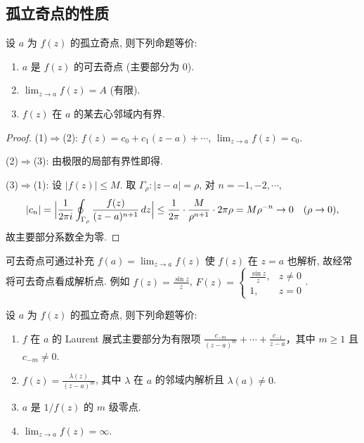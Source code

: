 \documentclass[theorem=false,mathfont=none,openany,sub3section]{easybook}
\begin{document}
\subsection{孤立奇点的性质}

\begin{theorem}[可去奇点的判定]
  设 $a$ 为 $f(z)$ 的孤立奇点, 则下列命题等价:
  \begin{enumerate}
    \item $a$ 是 $f(z)$ 的可去奇点 (主要部分为 $0$).
    \item $\lim_{z\to a}f(z)=A$ (有限).
    \item $f(z)$ 在 $a$ 的某去心邻域内有界.
  \end{enumerate}
\end{theorem}

\begin{proof}
  (1)$\Rightarrow$(2): $f(z)=c_{0}+c_{1}(z-a)+\cdots$, $\lim_{z\to a}f(z)=c_{0}$.

  (2)$\Rightarrow$(3): 由极限的局部有界性即得.

  (3)$\Rightarrow$(1): 设 $|f(z)|\leq M$. 取 $\Gamma_{\rho}:|z-a|=\rho$, 对 $n=-1,-2,\cdots$,
  \[
  |c_{n}|=\Bigl|\frac{1}{2\pi i}\oint_{\Gamma_{\rho}}\frac{f(z)}{(z-a)^{n+1}}\,dz\Bigr|
  \leq\frac{1}{2\pi}\cdot\frac{M}{\rho^{n+1}}\cdot2\pi\rho=M\rho^{-n}\to0\quad(\rho\to0),
  \]
  故主要部分系数全为零.
\end{proof}

\begin{remark}
  可去奇点可通过补充 $f(a)=\lim_{z\to a}f(z)$ 使 $f(z)$ 在 $z=a$ 也解析, 故经常将可去奇点看成解析点. 例如
  $f(z)=\frac{\sin z}{z}$, $F(z)=\begin{cases}\frac{\sin z}{z},&z\neq0\\1,&z=0\end{cases}$.
\end{remark}

\begin{theorem}[极点的判定]
  设 $a$ 为 $f(z)$ 的孤立奇点, 则下列命题等价:
  \begin{enumerate}
    \item $f$ 在 $a$ 的 Laurent 展式主要部分为有限项
    $\frac{c_{-m}}{(z-a)^{m}}+\cdots+\frac{c_{-1}}{z-a}$，其中 $m\geq1$ 且 $c_{-m}\neq0$.
    \item $f(z)=\frac{\lambda(z)}{(z-a)^{m}}$, 其中 $\lambda$ 在 $a$ 的邻域内解析且 $\lambda(a)\neq0$.
    \item $a$ 是 $1/f(z)$ 的 $m$ 级零点.
    \item $\lim_{z\to a}f(z)=\infty$.
  \end{enumerate}
\end{theorem}
\end{document}
